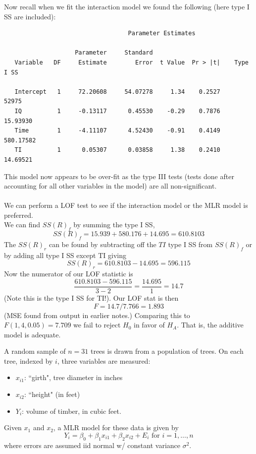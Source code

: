 Now recall when we fit the interaction model we found the following (here type I SS are included):
\begin{small}
\begin{verbatim}
                                   Parameter Estimates
 
                    Parameter     Standard
   Variable   DF     Estimate        Error  t Value  Pr > |t|    Type I SS   

   Intercept   1     72.20608     54.07278     1.34    0.2527        52975     
   IQ          1     -0.13117      0.45530    -0.29    0.7876     15.93930      
   Time        1     -4.11107      4.52430    -0.91    0.4149    580.17582      
   TI          1      0.05307      0.03858     1.38    0.2410     14.69521     
\end{verbatim}
\end{small}
This model now appears to be over-fit as the type III tests (tests done after accounting for all other variables in the model) are all non-significant.\\~\\
We can perform a LOF test to see if the interaction model or the MLR model is preferred.	\\
We can find $SS(R)_f$ by summing the type I SS, $$SS(R)_f=15.939+580.176+14.695=610.8103$$
The $SS(R)_r$ can be found by subtracting off the $TI$ type I SS from $SS(R)_f$ or by adding all type I SS except TI giving
$$SS(R)_r=610.8103-14.695=596.115$$
Now the numerator of our LOF statistic is
$$\frac{610.8103-596.115}{3-2}=\frac{14.695}{1}=14.7$$
(Note this is the type I SS for TI!).  Our LOF stat is then
$$F=14.7/7.766	=1.893$$
(MSE found from output in earlier notes.)  Comparing this to  $F(1,4,0.05)=7.709$ we fail to reject $H_0$ in favor of $H_A$.  That is, the additive model is adequate.

\newpage

A random sample of $n=31$ trees is drawn from a population of trees.  On each tree, indexed by $i$, three variables are measured:
\begin{itemize}
\item $x_{i1}$: ``girth", tree diameter in inches
\item $x_{i2}$: ``height" (in feet)
\item $Y_{i}$: volume of timber, in cubic feet.
\end{itemize}

Given $x_1$ and $x_2$, a MLR model for these data is given by 
$$ Y_i = \beta_0 + \beta_1 x_{i1} + \beta_2 x_{i2} + E_i \mbox{ for }i=1,\ldots,n$$ 
where errors are assumed iid normal w/ constant variance $\sigma^2$.
\bigskip
\par\noindent

